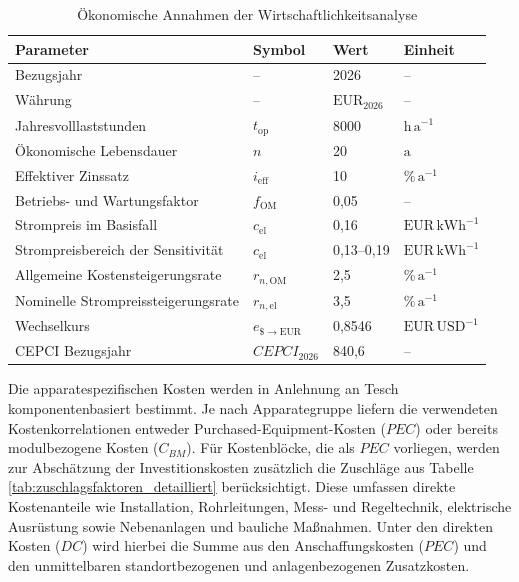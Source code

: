 \begin{table}[H]
\centering
\caption{Ökonomische Annahmen der Wirtschaftlichkeitsanalyse}
\label{tab:oekonomische_rahmenparameter}
\begin{tabular}{llll}
\toprule
\textbf{Parameter} & \textbf{Symbol} & \textbf{Wert} & \textbf{Einheit} \\
\midrule
Bezugsjahr & -- & 2026 & -- \\
Währung & -- & \(\mathrm{EUR}_{2026}\) & -- \\
Jahresvolllaststunden & \(t_\mathrm{op}\) & 8000 & \(\mathrm{h\,a^{-1}}\) \\
Ökonomische Lebensdauer & \(n\) & 20 & \(\mathrm{a}\) \\
Effektiver Zinssatz & \(i_\mathrm{eff}\) & 10 & \(\mathrm{\%\,a^{-1}}\) \\
Betriebs- und Wartungsfaktor & \(f_\mathrm{OM}\) & 0{,}05 & -- \\
Strompreis im Basisfall & \(c_\mathrm{el}\) & 0{,}16 & \(\mathrm{EUR\,kWh^{-1}}\) \\
Strompreisbereich der Sensitivität & \(c_\mathrm{el}\) & 0{,}13--0{,}19 & \(\mathrm{EUR\,kWh^{-1}}\) \\
Allgemeine Kostensteigerungsrate & \(r_{n,\mathrm{OM}}\) & 2{,}5 & \(\mathrm{\%\,a^{-1}}\) \\
Nominelle Strompreissteigerungsrate & \(r_{n,\mathrm{el}}\) & 3{,}5 & \(\mathrm{\%\,a^{-1}}\) \\
Wechselkurs & \(e_{\$ \rightarrow \mathrm{EUR}}\) & 0{,}8546 & \(\mathrm{EUR\,USD^{-1}}\) \\
CEPCI Bezugsjahr & \(CEPCI_{2026}\) & 840{,}6 & -- \\
\bottomrule
\end{tabular}
\end{table}
\noindent
Die apparatespezifischen Kosten werden in Anlehnung an Tesch \cite{teschExergybasedMethodsApplied} komponentenbasiert bestimmt. Je nach Apparategruppe liefern die verwendeten Kostenkorrelationen entweder Purchased-Equipment-Kosten ($PEC$) oder bereits modulbezogene Kosten ($C_{BM}$). Für Kostenblöcke, die als $PEC$ vorliegen, werden zur Abschätzung der Investitionskosten zusätzlich die Zuschläge aus Tabelle \ref{tab:zuschlagsfaktoren_detailliert} berücksichtigt. Diese umfassen direkte Kostenanteile wie Installation, Rohrleitungen, Mess- und Regeltechnik, elektrische Ausrüstung sowie Nebenanlagen und bauliche Maßnahmen. Unter den direkten Kosten ($DC$) wird hierbei die Summe aus den Anschaffungskosten ($PEC$)
und den unmittelbaren standortbezogenen und anlagenbezogenen Zusatzkosten.\\
